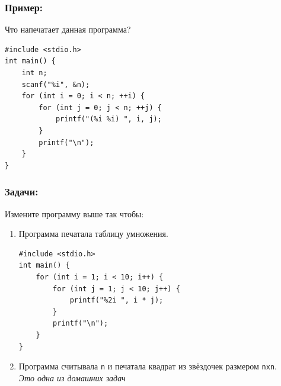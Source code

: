 \documentclass{article}
\begin{document}
\subsubsection*{Пример:}
Что напечатает данная программа?
\begin{lstlisting}
#include <stdio.h>
int main() {
    int n;
    scanf("%i", &n);
    for (int i = 0; i < n; ++i) {
        for (int j = 0; j < n; ++j) {
            printf("(%i %i) ", i, j);
        }
        printf("\n");
    }
}
\end{lstlisting}

\newpage
\subsubsection*{Задачи:}
Измените программу выше так чтобы:
\begin{enumerate}
\item Программа печатала таблицу умножения.
\begin{lstlisting}[backgroundcolor = \color{solcolor}]
#include <stdio.h>
int main() {
    for (int i = 1; i < 10; i++) {
    	for (int j = 1; j < 10; j++) {
        	printf("%2i ", i * j);
        }
        printf("\n");
    }
}
\end{lstlisting}
\item Программа считывала \texttt{n} и печатала квадрат из звёздочек размером \texttt{nxn}. \\
\textit{Это одна из домашних задач}
\end{enumerate}
\end{document}
